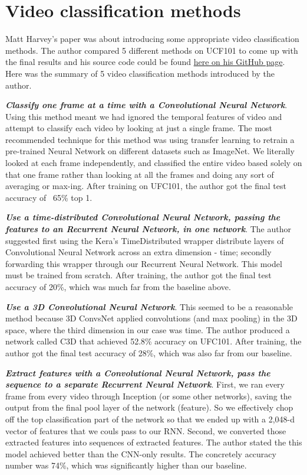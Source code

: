 \section{Video classification methods}
Matt Harvey's paper\cite{5videomethods} was about introducing some appropriate video classification methods. The author compared 5 different methods on UCF101\cite{ucf101} to come up with the final results and his source code could be found \href{https://github.com/harvitronix/five-video-classification-methods}{here on his GitHub page}. Here was the summary of 5 video classification methods introduced by the author.

\textbf{\emph{Classify one frame at a time with a Convolutional Neural Network}}. Using this method meant we had ignored the temporal features of video and attempt to classify each video by looking at just a single frame. The most recommended technique for this method was using transfer learning to retrain a pre-trained Neural Network on different datasets such as ImageNet. We literally looked at each frame independently, and classified the entire video based solely on that one frame rather than looking at all the frames and doing any sort of averaging or max-ing. After training on UFC101, the author got the final test accuracy of ~65\% top 1.

\textbf{\emph{Use a time-distributed Convolutional Neural Network, passing the features to an Recurrent Neural Network, in one network}}. The author suggested first using the Kera's TimeDistributed wrapper distribute layers of Convolutional Neural Network across an extra dimension - time; secondly forwarding this wrapper through our Recurrent Neural Network. This model must be trained from scratch. After training, the author got the final test accuracy of 20\%, which was much far from the baseline above. 

\textbf{\emph{Use a 3D Convolutional Neural Network}}. This seemed to be a reasonable method because 3D ConvsNet applied convolutions (and max pooling) in the 3D space, where the third dimension in our case was time. The author produced a network called C3D that achieved 52.8\% accuracy on UFC101. After training, the author got the final test accuracy of 28\%, which was also far from our baseline.

\textbf{\emph{Extract features with a Convolutional Neural Network, pass the sequence to a separate Recurrent Neural Network}}. First, we ran every frame from every video through Inception (or some other networks), saving the output from the final pool layer of the network (feature). So we effectively chop off the top classification part of the network so that we ended up with a 2,048-d vector of features that we couls pass to our RNN. Second, we converted those extracted features into sequences of extracted features. The author stated the this model achieved better than the CNN-only results. The concretely accuracy number was 74\%, which was significantly higher than our baseline.


